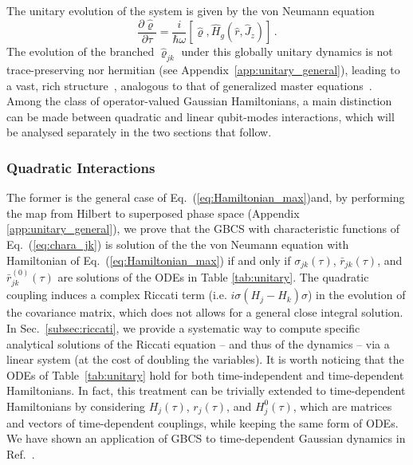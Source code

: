 \documentclass[%
reprint,
superscriptaddress,
nofootinbib,
 amsmath,amssymb,
prx,
floatfix,
]{revtex4-2}
\begin{document}
The unitary evolution of the system is given by the von Neumann equation \begin{equation}
\label{eq:vonNeumann_master}
    \frac{\partial \hat{\varrho}}{\partial \tau} =  \frac{i}{\hbar \omega} \left[ \hat{\varrho} , \hat{H}_g (\hat{r}, \hat{J}_z)  \right] \, .
    \end{equation}
The evolution of the branched $\hat{\varrho}_{jk}$ under this globally unitary dynamics is not trace-preserving nor hermitian (see Appendix~\ref{app:unitary_general}), leading to a vast, rich structure~\cite{Real_Bender_1998,ashida_nonhermitian_2020,third_mcdonald_2023}, analogous to that of generalized master equations~\cite{RevModPhys.70.101,RevModPhys.81.1665,PRXQuantum.5.020201}. Among the class of operator-valued Gaussian Hamiltonians, a main distinction can be made between quadratic and linear qubit-modes interactions, which will be analysed separately in the two sections that follow. 


\subsubsection{Quadratic Interactions \label{subsec:quadratic}}

The former is the general case of Eq.~(\ref{eq:Hamiltonian_max})and, by performing the map from Hilbert to superposed phase space (Appendix \ref{app:unitary_general}), we prove that the GBCS with characteristic functions of Eq.~(\ref{eq:chara_jk}) is solution of the the von Neumann equation with Hamiltonian of Eq.~(\ref{eq:Hamiltonian_max}) if and only if $\sigma_{jk} (\tau)$, $\bar{r}_{jk} (\tau)$, and $  \bar{r}_{jk}^{(0)}(\tau) $ are solutions of the ODEs in Table \ref{tab:unitary}. The quadratic coupling induces a complex Riccati term (i.e. $i \sigma (H_j - H_k) \sigma$) in the evolution of the covariance matrix, which does not allows for a general close integral solution. In Sec.~\ref{subsec:riccati}, we provide a systematic way to compute specific analytical solutions of the Riccati equation -- and thus of the dynamics -- via a linear system (at the cost of doubling the variables). It is worth noticing that the ODEs of Table~\ref{tab:unitary} hold for both time-independent and time-dependent Hamiltonians. In fact, this treatment can be trivially extended to time-dependent Hamiltonians by considering $H_j (\tau)$, $r_j (\tau)$, and $H_j^{0} (\tau)$, which are matrices and vectors of time-dependent couplings, while keeping the same form of ODEs. We have shown an application of GBCS to time-dependent Gaussian dynamics in Ref.~\cite{braccini_exponential_2024}. 
\end{document}
